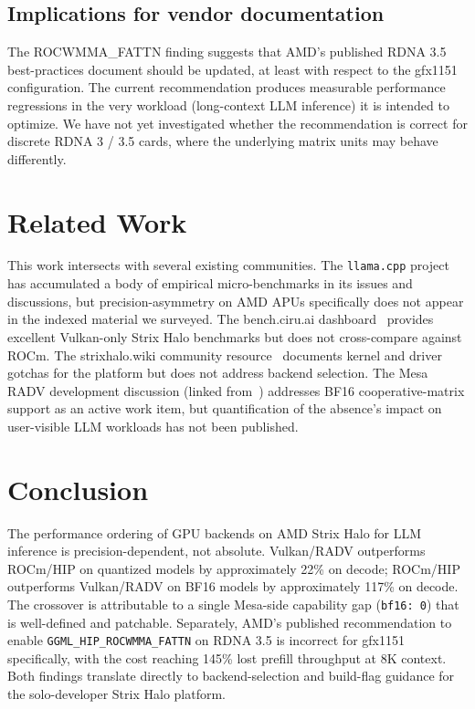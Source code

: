 \documentclass[10pt,a4paper]{article}
\begin{document}
\subsection{Implications for vendor documentation}

The ROCWMMA\_FATTN finding suggests that AMD's published RDNA 3.5 best-practices document should be updated, at least with respect to the gfx1151 configuration. The current recommendation produces measurable performance regressions in the very workload (long-context LLM inference) it is intended to optimize. We have not yet investigated whether the recommendation is correct for discrete RDNA 3 / 3.5 cards, where the underlying matrix units may behave differently.

\section{Related Work}

This work intersects with several existing communities. The \texttt{llama.cpp} project~\cite{llamacpp} has accumulated a body of empirical micro-benchmarks in its issues and discussions, but precision-asymmetry on AMD APUs specifically does not appear in the indexed material we surveyed. The bench.ciru.ai dashboard~\cite{benchciru} provides excellent Vulkan-only Strix Halo benchmarks but does not cross-compare against ROCm. The strixhalo.wiki community resource~\cite{strixhaloWiki} documents kernel and driver gotchas for the platform but does not address backend selection. The Mesa RADV development discussion (linked from~\cite{vkcoopmat2}) addresses BF16 cooperative-matrix support as an active work item, but quantification of the absence's impact on user-visible LLM workloads has not been published.

\section{Conclusion}

The performance ordering of GPU backends on AMD Strix Halo for LLM inference is precision-dependent, not absolute. Vulkan/RADV outperforms ROCm/HIP on quantized models by approximately 22\% on decode; ROCm/HIP outperforms Vulkan/RADV on BF16 models by approximately 117\% on decode. The crossover is attributable to a single Mesa-side capability gap (\texttt{bf16: 0}) that is well-defined and patchable. Separately, AMD's published recommendation to enable \texttt{GGML\_HIP\_ROCWMMA\_FATTN} on RDNA 3.5 is incorrect for gfx1151 specifically, with the cost reaching 145\% lost prefill throughput at 8K context. Both findings translate directly to backend-selection and build-flag guidance for the solo-developer Strix Halo platform.
\end{document}
